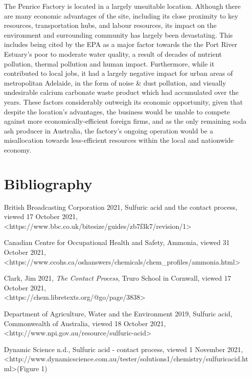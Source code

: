 \documentclass[12pt, a4paper]{article}
\begin{document}
The Penrice Factory is located in a largely unsuitable location. Although there are many economic advantages of the site, including its close proximity to key resources, transportation hubs, and labour resources, its impact on the environment and surrounding community has largely been devastating. This includes being cited by the EPA as a major factor towards the the Port River Estuary's poor to moderate water quality, a result of decades of nutrient pollution, thermal pollution and human impact. Furthermore, while it contributed to local jobs, it had a largely negative impact for urban areas of metropolitan Adelaide, in the form of noise \& dust pollution, and visually undesirable calcium carbonate waste product which had accumulated over the years. These factors considerably outweigh its economic opportunity, given that despite the location's advantages, the business would be unable to compete against more economically-efficient foreign firms, and as the only remaining soda ash producer in Australia, the factory's ongoing operation would be a misallocation towards less-efficient resources within the local and nationwide economy.

\pagebreak

\section{Bibliography}

British Broadcasting Corporation 2021, Sulfuric acid and the contact process, viewed 17 October 2021, \\ \textless{https://www.bbc.co.uk/bitesize/guides/zb7f3k7/revision/1}\textgreater

Canadian Centre for Occupational Health and Safety, Ammonia, viewed 31 October 2021, \\ \textless{https://www.ccohs.ca/oshanswers/chemicals/chem\_profiles/ammonia.html}\textgreater

Clark, Jim 2021, \emph{The Contact Process}, Truro School in Cornwall, viewed 17 October 2021, \\ \textless{https://chem.libretexts.org/@go/page/3838}\textgreater

Department of Agriculture, Water and the Environment 2019, Sulfuric acid, Commonwealth of Australia, viewed 18 October 2021, \textless{http://www.npi.gov.au/resource/sulfuric-acid}\textgreater

Dynamic Science n.d., Sulfuric acid - contact process, viewed 1 November 2021, \textless{http://www.dynamicscience.com.au/tester/solutions1/chemistry/sulfuricacid.html}\textgreater (Figure 1)
\end{document}
